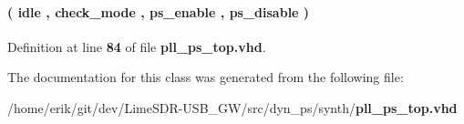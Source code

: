 \paragraph[{state\+\_\+type}]{ {\bfseries \textcolor{vhdlchar}{(}\textcolor{vhdlchar}{ }\textcolor{vhdlchar}{idle}\textcolor{vhdlchar}{ }\textcolor{vhdlchar}{,}\textcolor{vhdlchar}{ }\textcolor{vhdlchar}{check\+\_\+mode}\textcolor{vhdlchar}{ }\textcolor{vhdlchar}{,}\textcolor{vhdlchar}{ }\textcolor{vhdlchar}{ps\+\_\+enable}\textcolor{vhdlchar}{ }\textcolor{vhdlchar}{,}\textcolor{vhdlchar}{ }\textcolor{vhdlchar}{ps\+\_\+disable}\textcolor{vhdlchar}{ }\textcolor{vhdlchar}{)}\textcolor{vhdlchar}{ }} \hspace{0.3cm}{\ttfamily [Type]}}\label{classpll__ps__top_1_1arch_aefe90f742ab77041b45b86389633551b}


Definition at line {\bf 84} of file {\bf pll\+\_\+ps\+\_\+top.\+vhd}.



The documentation for this class was generated from the following file\+:\begin{DoxyCompactItemize}
\item 
/home/erik/git/dev/\+Lime\+S\+D\+R-\/\+U\+S\+B\+\_\+\+G\+W/src/dyn\+\_\+ps/synth/{\bf pll\+\_\+ps\+\_\+top.\+vhd}\end{DoxyCompactItemize}
